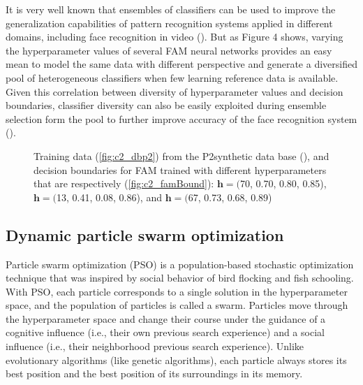 It is very well known that ensembles of classifiers can be used to improve the generalization capabilities of pattern recognition systems applied in different domains, including face recognition in video (\cite{er02, lu06, su07}).
But as Figure 4 shows, varying the hyperparameter values of several FAM neural networks provides an easy mean to model the same data with different perspective and generate a diversified pool of heterogeneous classifiers when few learning reference data is available. 
Given this correlation between diversity of hyperparameter values and decision boundaries, classifier diversity can also be easily exploited during ensemble selection form the pool to further improve accuracy of the face recognition system (\cite{brown05}).

\begin{figure*}[t]
  \centering
  \caption{Training data (\ref{fig:c2_dbp2}) from the P2synthetic data base (\cite{valentini03}), and decision boundaries for FAM trained with different hyperparameters that are respectively (\ref{fig:c2_famBound}): $\textbf{h}=($70, 0.70, 0.80, 0.85), $\textbf{h}=($13, 0.41, 0.08, 0.86), and $\textbf{h}=($67, 0.73, 0.68, 0.89)}
	\label{fig:c2_bound}
\end{figure*}

\subsection{Dynamic particle swarm optimization}
\label{sec:c2_dpso}

Particle swarm optimization (PSO) is a population-based stochastic optimization technique that was inspired by social behavior of bird flocking and fish schooling.
With PSO, each particle corresponds to a single solution in the hyperparameter space, and the population of particles is called a swarm.
Particles move through the hyperparameter space and change their course under the guidance of a cognitive influence (i.e., their own previous search experience) and a social influence (i.e., their neighborhood previous search experience).
Unlike evolutionary algorithms (like genetic algorithms), each particle always stores its best position and the best position of its surroundings in its memory.

